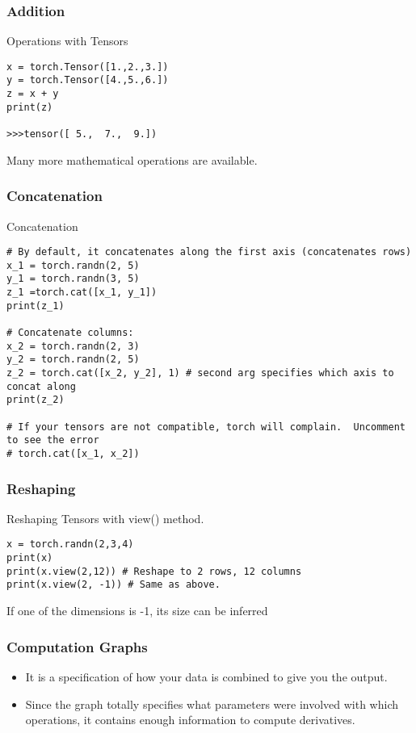 \begin{frame}[fragile]
\frametitle{Addition}
Operations with Tensors
 \begin{lstlisting}
x = torch.Tensor([1.,2.,3.])
y = torch.Tensor([4.,5.,6.])
z = x + y
print(z)

>>>tensor([ 5.,  7.,  9.])
 \end{lstlisting}
Many more mathematical operations are available.
 \end{frame} 
 
\begin{frame}[fragile]
\frametitle{Concatenation}
Concatenation
 \begin{lstlisting}
# By default, it concatenates along the first axis (concatenates rows)
x_1 = torch.randn(2, 5)
y_1 = torch.randn(3, 5)
z_1 =torch.cat([x_1, y_1])
print(z_1)

# Concatenate columns:
x_2 = torch.randn(2, 3)
y_2 = torch.randn(2, 5)
z_2 = torch.cat([x_2, y_2], 1) # second arg specifies which axis to concat along
print(z_2)

# If your tensors are not compatible, torch will complain.  Uncomment to see the error
# torch.cat([x_1, x_2])
 \end{lstlisting}
 \end{frame} 
 
\begin{frame}[fragile]
\frametitle{Reshaping}
Reshaping Tensors with view() method.
 \begin{lstlisting}
x = torch.randn(2,3,4)
print(x)
print(x.view(2,12)) # Reshape to 2 rows, 12 columns
print(x.view(2, -1)) # Same as above. 
 \end{lstlisting}
  If one of the dimensions is -1, its size can be inferred
 \end{frame} 
 
\begin{frame}[fragile]
\frametitle{Computation Graphs}

\begin{itemize}
\item It is a specification of how your data is combined to give you the output. 
\item Since the graph totally specifies what parameters were involved with which operations, it contains enough information to compute derivatives.
\end{itemize}
 \end{frame} 
 
